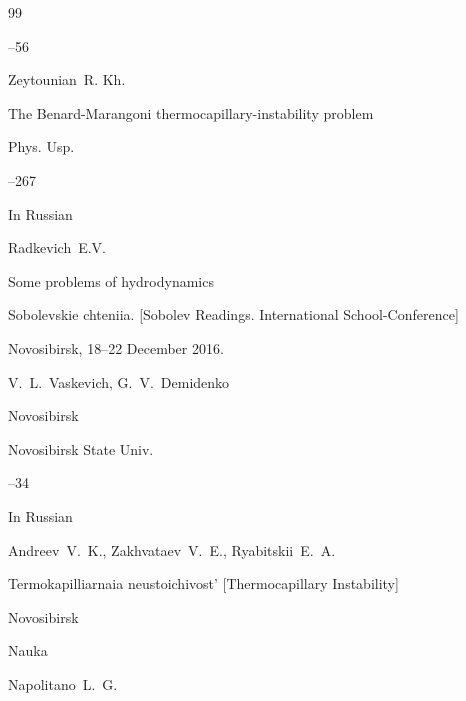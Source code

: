 \begin{thebibliography}{99}



--56








\by Zeytounian~R. Kh.

\paper The Benard-Marangoni thermocapillary-instability problem

\jour Phys. Usp. 



–267 






\lang In Russian

\by Radkevich~E.V.

\paper Some problems of hydrodynamics

\inbook Sobolevskie chteniia. \rm [Sobolev Readings. International School-Conference]

\procinfo Novosibirsk, 18--22 December 2016.

\eds V.~L.~Vaskevich, G.~V.~Demidenko

\publaddr Novosibirsk

\publ Novosibirsk State Univ.


--34








\lang In Russian

\by Andreev~V.~K., Zakhvataev~V.~E., Ryabitskii~E.~A. 

\book Termokapilliarnaia neustoichivost' \rm [Thermocapillary Instability]

\publaddr Novosibirsk

\publ Nauka








\by Napolitano~L.~G.


\end{thebibliography}
